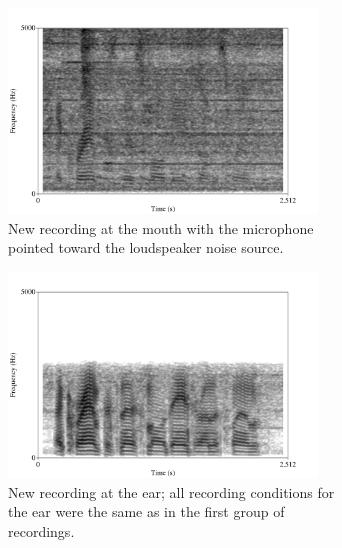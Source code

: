 \begin{figure}[h!]
\begin{subfigure}{0.45\textwidth}
  \DIFaddendFL \centering
  \includegraphics[width=0.9\textwidth]{figure/spectNewMouthNoise.png}
  \caption{New recording at the mouth with the microphone pointed toward the loudspeaker noise source.}
  \label{fig:spectNewMouthNoise}
\end{subfigure}
\DIFdelbeginFL %
\DIFdelendFL \DIFaddbeginFL \qquad
\begin{subfigure}{0.45\textwidth}
  \DIFaddendFL \centering
  \includegraphics[width=0.9\textwidth]{figure/spectNewEarNoise.png}
  \caption{New recording at the ear; all recording conditions for the ear were the same as in the first group of recordings.}
  \label{fig:spectNewEarNoise}
\end{subfigure}
\DIFaddbeginFL \\[2ex]
\begin{subfigure}{0.45\textwidth}

\end{subfigure}
\end{figure}
